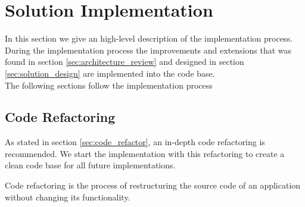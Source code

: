 \section{Solution Implementation}
\label{sec:solution_implementation}


In this section we give an high-level description of the implementation process.
During the implementation process the improvements and extensions that was found in section \ref{sec:architecture_review} and designed in section \ref{sec:solution_design} are implemented into the code base.
\\

The following sections follow the implementation process



\subsection{Code Refactoring}
\label{sec:impl_code_refactor}
As stated in section \ref{sec:code_refactor}, an in-depth code refactoring is recommended.
We start the implementation with this refactoring to create a clean code base for all future implementations.

Code refactoring is the process of restructuring the source code of an application without changing its functionality\cite{fowlerRefactoringImprovingDesign2019a}.